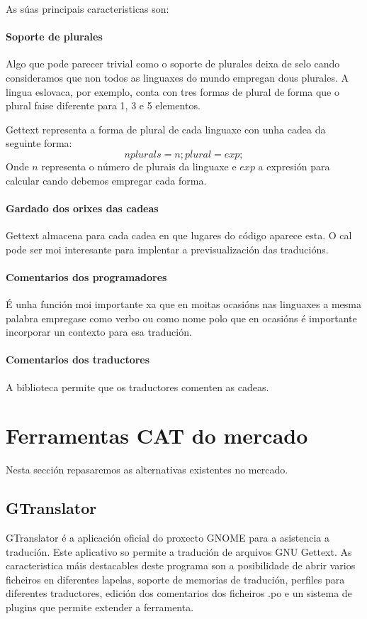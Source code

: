 As súas principais caracteristicas son:

\paragraph{Soporte de plurales}
Algo que pode parecer trivial como o soporte de plurales deixa de selo cando consideramos que non todos as linguaxes do mundo empregan dous plurales. A lingua eslovaca, por exemplo, conta con tres formas de plural de forma que o plural faise diferente para 1, 3 e 5 elementos.

Gettext representa a forma de plural de cada linguaxe con unha cadea da seguinte forma: $$nplurals=n; plural=exp;$$ Onde $n$ representa o número de plurais da linguaxe e $exp$ a expresión para calcular cando debemos empregar cada forma.

\paragraph{Gardado dos orixes das cadeas}
Gettext almacena para cada cadea en que lugares do código aparece esta. O cal pode ser moi interesante para implentar a previsualización das traducións.

\paragraph{Comentarios dos programadores}
É unha función moi importante xa que en moitas ocasións nas linguaxes a mesma palabra empregase como verbo ou como nome polo que en ocasións é importante incorporar un contexto para esa tradución.

\paragraph{Comentarios dos traductores}
A biblioteca permite que os traductores comenten as cadeas.

\section{Ferramentas CAT do mercado}

Nesta sección repasaremos as alternativas existentes no mercado.

\subsection{GTranslator}
GTranslator é a aplicación oficial do proxecto GNOME para a asistencia a tradución. Este aplicativo so permite a tradución de arquivos GNU Gettext. As caracteristica máis destacables deste programa son a posibilidade de abrir varios ficheiros en diferentes lapelas, soporte de memorias de tradución, perfiles para diferentes traductores, edición dos comentarios dos ficheiros .po e un sistema de plugins que permite extender a ferramenta.

